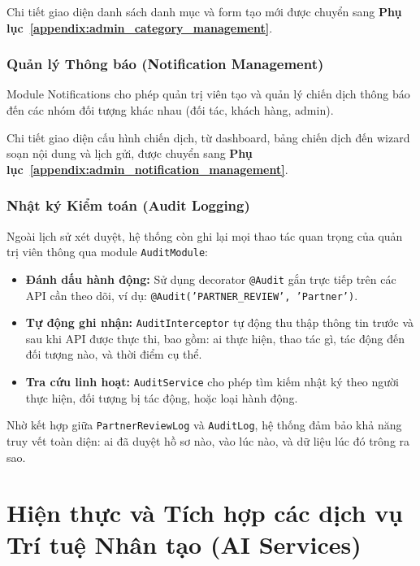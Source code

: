 Chi tiết giao diện danh sách danh mục và form tạo mới được chuyển sang \textbf{Phụ lục~\ref{appendix:admin_category_management}}.

\subsubsection{Quản lý Thông báo (Notification Management)}
Module Notifications cho phép quản trị viên tạo và quản lý chiến dịch thông báo đến các nhóm đối tượng khác nhau (đối tác, khách hàng, admin).

Chi tiết giao diện cấu hình chiến dịch, từ dashboard, bảng chiến dịch đến wizard soạn nội dung và lịch gửi, được chuyển sang \textbf{Phụ lục~\ref{appendix:admin_notification_management}}.

\subsubsection{Nhật ký Kiểm toán (Audit Logging)}

Ngoài lịch sử xét duyệt, hệ thống còn ghi lại mọi thao tác quan trọng của quản trị viên thông qua module \texttt{AuditModule}:

\begin{itemize}
    \item \textbf{Đánh dấu hành động:} Sử dụng decorator \texttt{@Audit} gắn trực tiếp trên các API cần theo dõi, ví dụ: \texttt{@Audit('PARTNER\_REVIEW', 'Partner')}.
    \item \textbf{Tự động ghi nhận:} \texttt{AuditInterceptor} tự động thu thập thông tin trước và sau khi API được thực thi, bao gồm: ai thực hiện, thao tác gì, tác động đến đối tượng nào, và thời điểm cụ thể.
    \item \textbf{Tra cứu linh hoạt:} \texttt{AuditService} cho phép tìm kiếm nhật ký theo người thực hiện, đối tượng bị tác động, hoặc loại hành động.
\end{itemize}

Nhờ kết hợp giữa \texttt{PartnerReviewLog} và \texttt{AuditLog}, hệ thống đảm bảo khả năng truy vết toàn diện: ai đã duyệt hồ sơ nào, vào lúc nào, và dữ liệu lúc đó trông ra sao.



\section{Hiện thực và Tích hợp các dịch vụ Trí tuệ Nhân tạo (AI Services)}

